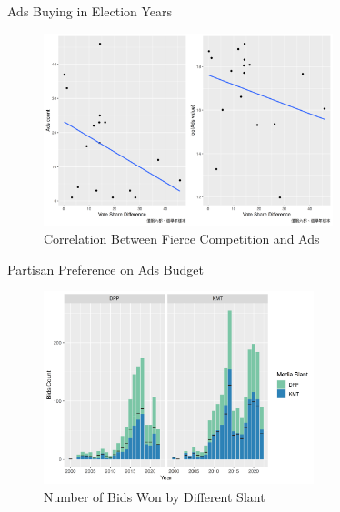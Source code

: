 \documentclass[
  10pt,
  ignorenonframetext,
  aspectratio=169,
]{beamer}
\begin{document}
\begin{frame}{Ads Buying in Election Years}
\protect\hypertarget{ads-buying-in-election-years}{}
\begin{figure}
\centering
\includegraphics[width=0.75\textwidth,height=\textheight]{./graphs/electionTender-1.png}
\caption{Correlation Between Fierce Competition and Ads}
\end{figure}
\end{frame}

\begin{frame}{Partisan Preference on Ads Budget}
\protect\hypertarget{partisan-preference-on-ads-budget}{}
\begin{figure}
\centering
\includegraphics[width=0.7\textwidth,height=\textheight]{./graphs/partyBidPreference-1.png}
\caption{Number of Bids Won by Different Slant}
\end{figure}
\end{frame}
\end{document}
